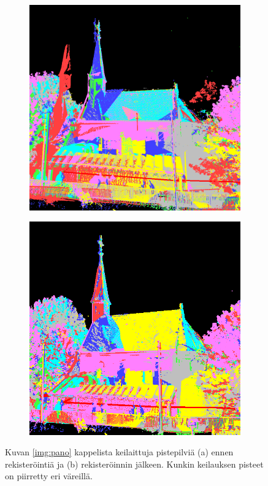 \begin{figure}
    \begin{subfigure}{.5\textwidth}
        \centering
        \includegraphics[width=.89\linewidth]{img/reg1.png}
        \caption{}
    \end{subfigure}%
    \begin{subfigure}{.5\textwidth}
        \centering
        \includegraphics[width=.855\linewidth]{img/reg2.png}
        \caption{}
    \end{subfigure}
    \caption{Kuvan \ref{img:pano} kappelista keilaittuja pistepilviä (a) ennen rekisteröintiä ja (b) rekisteröinnin jälkeen. Kunkin keilauksen pisteet on piirretty eri väreillä.}
    \label{img:reg}
\end{figure}

